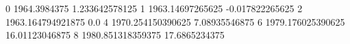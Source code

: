 0 1964.3984375 1.233642578125
1 1963.14697265625 -0.017822265625
2 1963.164794921875 0.0
4 1970.254150390625 7.08935546875
6 1979.176025390625 16.01123046875
8 1980.851318359375 17.6865234375

